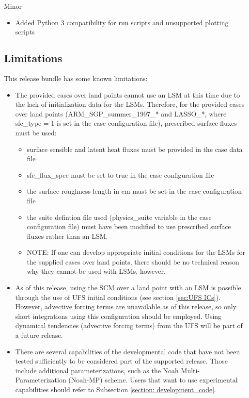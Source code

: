 Minor
\begin{itemize}
\item Added Python 3 compatibility for run scripts and unsupported plotting scripts
\end{itemize}

\subsection{Limitations}

This release bundle has some known limitations:

\begin{itemize}
\item The provided cases over land points cannot use an LSM at this time due to the lack of initialization data for the LSMs. Therefore, for the provided cases over land points (ARM\_SGP\_summer\_1997\_* and LASSO\_*, where sfc\_type = 1 is set in the case configuration file), prescribed surface fluxes must be used:
\begin{itemize}
\item surface sensible and latent heat fluxes must be provided in the case data file
\item sfc\_flux\_spec must be set to true in the case configuration file
\item the surface roughness length in cm must be set in the case configuration file
\item the suite defintion file used (physics\_suite variable in the case configuration file) must have been modified to use prescribed surface fluxes rather than an LSM.
\item NOTE: If one can develop appropriate initial conditions for the LSMs for the supplied cases over land points, there should be no technical reason why they cannot be used with LSMs, however.
\end{itemize}
\item As of this release, using the SCM over a land point with an LSM is possible through the use of UFS initial conditions (see section \ref{sec:UFS ICs}). However, advective forcing terms are unavailable as of this release, so only short integrations using this configuration should be employed. Using dynamical tendencies (advective forcing terms) from the UFS will be part of a future release.
\item There are several capabilities of the developmental code that have not been tested sufficiently to be considered part of the supported release. Those include additional parameterizations, such as the Noah Multi-Parameterization (Noah-MP) scheme. Users that want to use experimental capabilities should refer to Subsection \ref{section: development_code}.
\end{itemize}
